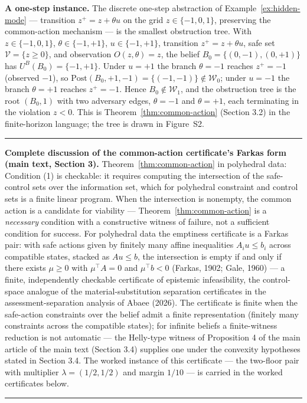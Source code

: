 \documentclass[11pt]{article}
\theoremstyle{definition}
\begin{document}
\textbf{A one-step instance.} The discrete one-step abstraction of
Example~\ref{ex:hidden-mode} --- transition \(z^+ = z + \theta u\) on
the grid \(z \in \{-1,0,1\}\), preserving the common-action mechanism
--- is the smallest obstruction tree. With
\(z\in\{-1,0,1\}\), \(\theta\in\{-1,+1\}\), \(u\in\{-1,+1\}\),
transition \(z^+=z+\theta u\), safe set \(\mathcal V=\{z\ge 0\}\), and
observation \(O(z,\theta)=z\), the belief \(B_0=\{(0,-1),(0,+1)\}\) has
\(U^B(B_0)=\{-1,+1\}\). Under \(u=+1\) the branch \(\theta=-1\) reaches
\(z^+=-1\) (observed \(-1\)), so
\(\mathrm{Post}(B_0,+1,-1)=\{(-1,-1)\}\notin\mathcal W_0\); under
\(u=-1\) the branch \(\theta=+1\) reaches \(z^+=-1\). Hence
\(B_0\notin\mathcal W_1\), and the obstruction tree is the root
\((B_0,1)\) with two adversary edges, \(\theta=-1\) and \(\theta=+1\),
each terminating in the violation \(z<0\). This is
Theorem~\ref{thm:common-action} (Section 3.2) in the finite-horizon language; the tree is drawn in Figure~S2.
\rule{0.5\linewidth}{0.5pt}

\bigskip
\noindent\textbf{Complete discussion of the common-action certificate's Farkas form (main text, Section 3).}
Theorem~\ref{thm:common-action} in polyhedral data:
Condition (1) is checkable: it requires computing the intersection of
the safe-control sets over the information set, which for polyhedral
constraint and control sets is a finite linear program. When the
intersection is nonempty, the common action is a candidate for viability
--- Theorem~\ref{thm:common-action} is a \emph{necessary} condition with a constructive
witness of failure, not a sufficient condition for success. For
polyhedral data the emptiness certificate is a Farkas pair: with safe
actions given by finitely many affine inequalities \(A_i u \le b_i\)
across compatible states, stacked as \(A u \le b\), the intersection is
empty if and only if there exists \(\mu \ge 0\) with \(\mu^{\top} A = 0\) and \(\mu^{\top} b < 0\) (Farkas, 1902;
Gale, 1960) --- a finite, independently checkable certificate of
epistemic infeasibility, the control-space analogue of the material-substitution separation certificates in the assessment-separation analysis of Abaee (2026). The certificate
is finite when the safe-action constraints over the belief admit a finite
representation (finitely many constraints across the compatible states);
for infinite beliefs a finite-witness reduction is not automatic --- the Helly-type witness of Proposition 4 of the main article of the main text (Section 3.4) supplies one under the convexity hypotheses stated in Section 3.4. The worked instance of this certificate --- the two-floor pair with multiplier \(\lambda = (1/2, 1/2)\) and margin \(1/10\) --- is carried in the worked certificates below.
\rule{0.5\linewidth}{0.5pt}
\end{document}
